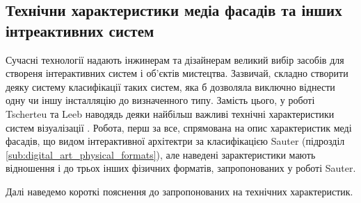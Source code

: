 \documentclass[a4paper,ukrainian,utf8,nocolumnsxix,floatsection]{eskdtext}
\newcommand{\todoi}[1]{\todo[inline]{#1}}
\begin{document}
\subsection{Технічни характеристики медіа фасадів та інших інтреактивних систем}

Сучасні технології надають інжинерам та дізайнерам великий вибір засобів для створеня інтерактивних систем і об’єктів мистецтва. Зазвичай, складно створити деяку систему класифікації таких систем, яка б дозволяла виключно віднести одну чи іншу інсталляцію до визначенного типу. Замість цього, у роботі  Tscherteu та Leeb наводядь деяки найбільш важливі технічні характеристики систем візуалізації . Робота, перш за все, спрямована на опис характеристик меді фасадів, що видом інтерактивної архітектри за класифікацією Sauter (підрозділ \ref{sub:digital_art_physical_formats}), але наведені зарактеристики мають відношення і до трьох інших фізичних форматів, запропонованих у роботі Sauter.

\todoi{схема}

Далі наведемо короткі пояснення до запропонованих на  технічних характеристик.
\end{document}
